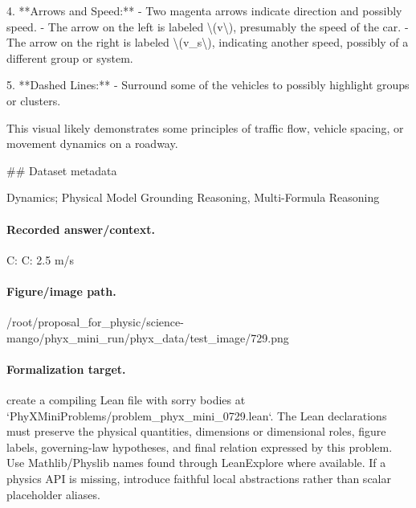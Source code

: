 4. **Arrows and Speed:**
   - Two magenta arrows indicate direction and possibly speed.
   - The arrow on the left is labeled \textbackslash{}(v\textbackslash{}), presumably the speed of the car.
   - The arrow on the right is labeled \textbackslash{}(v\_s\textbackslash{}), indicating another speed, possibly of a different group or system.

5. **Dashed Lines:**
   - Surround some of the vehicles to possibly highlight groups or clusters.

This visual likely demonstrates some principles of traffic flow, vehicle spacing, or movement dynamics on a roadway.

\#\# Dataset metadata

Dynamics; Physical Model Grounding Reasoning, Multi-Formula Reasoning

\paragraph{Recorded answer/context.}
C: C: 2.5 m/s

\paragraph{Figure/image path.}
/root/proposal\_for\_physic/science-mango/phyx\_mini\_run/phyx\_data/test\_image/729.png

\paragraph{Formalization target.}
create a compiling Lean file with sorry bodies at `PhyXMiniProblems/problem\_phyx\_mini\_0729.lean`. The Lean declarations must preserve the physical quantities, dimensions or dimensional roles, figure labels, governing-law hypotheses, and final relation expressed by this problem.
Use Mathlib/Physlib names found through LeanExplore where available. If a physics API is missing, introduce faithful local abstractions rather than scalar placeholder aliases.


